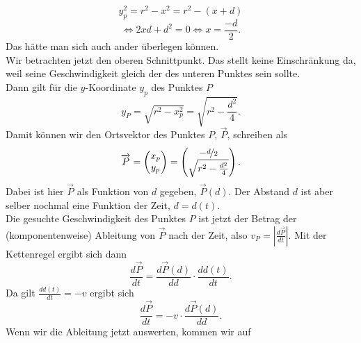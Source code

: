 \begin{Answer}[ref = circlemove]
	\begin{equation*}
		y_p^2 = r^2-x^2 = r^2-\left(x+d\right)
	\end{equation*}
	\begin{equation}\label{circlemove:xcoord}
		\Leftrightarrow 2xd + d^2 = 0 \Leftrightarrow x = \frac{-d}{2}.
	\end{equation}
	Das hätte man sich auch ander überlegen können.\\
	Wir betrachten jetzt den oberen Schnittpunkt. Das stellt keine Einschränkung da, weil seine Geschwindigkeit gleich der des unteren Punktes sein sollte.\\
	Dann gilt für die $y$-Koordinate $y_p$ des Punktes $P$
	\begin{equation}\label{circlemove:ycoord}
		y_P =  \sqrt{r^2-x_p^2} = \sqrt{r^2-\frac{d^2}{4}}.
	\end{equation}
	Damit können wir den Ortsvektor des Punktes $P$, $\overrightarrow{P}$, schreiben als
	\begin{equation}\label{circlemove:pvec}
		\overrightarrow{P} =\begin{pmatrix}
		x_p\\
		y_p
		\end{pmatrix}  = \begin{pmatrix}
		-\nicefrac{d}{2}\\
		\sqrt{r^2-\frac{d^2}{4}}
		\end{pmatrix}.
	\end{equation}
	Dabei ist hier $\overrightarrow{P}$ als Funktion von $d$ gegeben, $\overrightarrow{P}\left(d\right)$. Der Abstand $d$ ist aber selber nochmal eine Funktion der Zeit, $d = d\left(t\right)$.\\
	Die gesuchte Geschwindigkeit des Punktes $P$ ist jetzt der Betrag der (komponentenweise) Ableitung von $\overrightarrow{P}$ nach der Zeit, also $v_P = \left|\frac{d\overrightarrow{P}}{dt}\right|$. Mit der Kettenregel ergibt sich dann
	\begin{equation*}
		\frac{d\overrightarrow{P}}{dt} = \frac{d\overrightarrow{P}\left(d\right)}{dd}\cdot  \frac{dd\left(t\right)}{dt}.
	\end{equation*}
	Da gilt $\frac{dd\left(t\right)}{dt} = -v$ ergibt sich
	\begin{equation}
		\frac{d\overrightarrow{P}}{dt} = -v\cdot \frac{d\overrightarrow{P}\left(d\right)}{dd}.
	\end{equation}
	Wenn wir die Ableitung jetzt auswerten, kommen wir auf
	\begin{equation}\label{circlemove:pder}

\end{equation}
\end{Answer}
